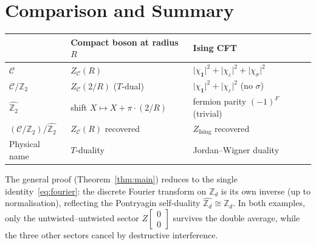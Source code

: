 \documentclass[11pt,a4paper]{article}
\theoremstyle{plain}
\theoremstyle{definition}
\theoremstyle{remark}
\newcommand{\Ztwo}{\mathbb{Z}_2}
\newcommand{\Zd}{\mathbb{Z}_d}
\newcommand{\Cft}{\mathcal{C}}
\newcommand{\partfn}[2]{Z\!\begin{bmatrix}#1\\#2\end{bmatrix}}
\newcommand{\abs}[1]{\lvert #1 \rvert}
\begin{document}
\section{Comparison and Summary}

\begin{center}
\renewcommand{\arraystretch}{1.6}
\begin{tabular}{l|ll}
  \toprule
  & Compact boson at radius $R$ & Ising CFT \\
  \midrule
  $\Cft$ &
  $Z_{\Cft}(R)$ &
  $\abs{\chi_{\mathbf{1}}}^2+\abs{\chi_\varepsilon}^2+\abs{\chi_\sigma}^2$ \\
  $\Cft/\Ztwo$ &
  $Z_{\Cft}(2/R)$ \;($T$-dual) &
  $\abs{\chi_{\mathbf{1}}}^2+\abs{\chi_\varepsilon}^2$ \;(no $\sigma$) \\
  $\hat{\Ztwo}$ &
  shift $X\mapsto X+\pi\cdot(2/R)$ &
  fermion parity $(-1)^F$ (trivial) \\
  $(\Cft/\Ztwo)/\hat{\Ztwo}$ &
  $Z_{\Cft}(R)$ recovered &
  $Z_{\mathrm{Ising}}$ recovered \\
  Physical name &
  $T$-duality &
  Jordan--Wigner duality \\
  \bottomrule
\end{tabular}
\end{center}

\bigskip
\noindent
The general proof (Theorem~\ref{thm:main}) reduces to the single
identity~\eqref{eq:fourier}: the discrete Fourier transform on $\Zd$
is its own inverse (up to normalisation), reflecting the Pontryagin
self-duality $\widehat{\Zd}\cong\Zd$.  In both examples, only the
untwisted--untwisted sector $\partfn{0}{0}$ survives the double average,
while the three other sectors cancel by destructive interference.
\end{document}
